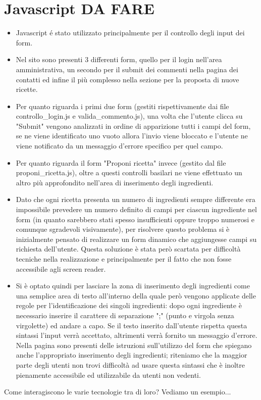 \documentclass[12pt]{article}
\begin{document}
			\section{Javascript DA FARE}
			\begin{itemize}
				

				\item Javascript \'e stato utilizzato principalmente per il controllo degli input dei form. 
				\item Nel sito sono presenti 3 differenti form, quello per il login nell'area amministrativa, un secondo per il submit dei commenti nella pagina dei contatti ed infine il pi\`u complesso nella sezione per la proposta di nuove ricette. 
				\item Per quanto riguarda i primi due form (gestiti rispettivamente dai file controllo\_login.js e valida\_commento.js), una volta che l'utente clicca su "Submit" vengono analizzati in ordine di apparizione tutti i campi del form, se ne viene identificato uno vuoto allora l'invio viene bloccato e l'utente ne viene notificato da un messaggio d'errore specifico per quel campo.
				\item Per quanto riguarda il form "Proponi ricetta" invece (gestito dal file proponi\_ricetta.js), oltre a questi controlli basilari ne viene effettuato un altro pi\`u approfondito nell'area di inserimento degli ingredienti. 
				\item Dato che ogni ricetta presenta un numero di ingredienti sempre differente era impossibile prevedere un numero definito di campi per ciascun ingrediente nel form (in quanto sarebbero stati spesso insufficienti oppure troppo numerosi e comunque sgradevoli visivamente), per risolvere questo problema si \`e inizialmente pensato di realizzare un form dinamico che aggiungesse campi su richiesta dell'utente. Questa soluzione \`e stata però scartata per difficolt\`a tecniche nella realizzazione e principalmente per il fatto che non fosse accessibile agli screen reader. 
				\item Si \`e optato quindi per lasciare la zona di inserimento degli ingredienti come una semplice area di testo all'interno della quale per\`o vengono applicate delle regole per l'identificazione dei singoli ingredienti: dopo ogni ingrediente \`e necessario inserire il carattere di separazione ";" (punto e virgola senza virgolette) ed andare a capo. Se il testo inserito dall'utente rispetta questa sintassi l'input verr\`a accettato, altrimenti verr\`a fornito un messaggio d'errore. Nella pagina sono presenti delle istruzioni sull'utilizzo del form che spiegano anche l'appropriato inserimento degli ingredienti; riteniamo che la maggior parte degli utenti non trovi difficolt\`a ad usare questa sintassi che \`e inoltre pienamente accessibile ed utilizzabile da utenti non vedenti.		
		
			\end{itemize}
	\newpage
	Come interagiscono le varie tecnologie tra di loro? Vediamo un esempio...
\end{document}
